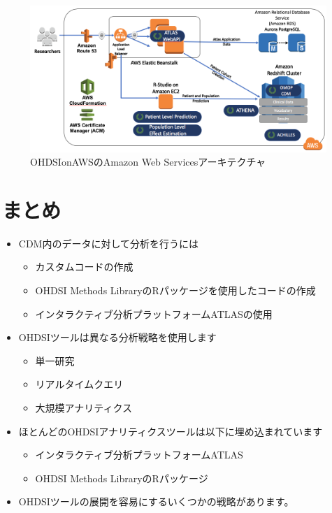 \documentclass[
  11pt]{book}
\makeatletter
\providecommand{\tightlist}{%
  \setlength{\itemsep}{0pt}\setlength{\parskip}{0pt}}
\newenvironment{kframe}{%
\medskip{}
\setlength{\fboxsep}{.8em}
 \def\at@end@of@kframe{}%
 \ifinner\ifhmode%
  \def\at@end@of@kframe{\end{minipage}}%
  \begin{minipage}{\columnwidth}%
 \fi\fi%
 \def\FrameCommand##1{\hskip\@totalleftmargin \hskip-\fboxsep
 \colorbox{myShadeColor}{##1}\hskip-\fboxsep
     \hskip-\linewidth \hskip-\@totalleftmargin \hskip\columnwidth}%
 \MakeFramed {\advance\hsize-\width
   \@totalleftmargin\z@ \linewidth\hsize
   \@setminipage}}%
 {\par\unskip\endMakeFramed%
 \at@end@of@kframe}
\newenvironment{rmdblock}[1]
  {
  \begin{itemize}
  \renewcommand{\labelitemi}{
    \raisebox{-.7\height}[0pt][0pt]{
      {\setkeys{Gin}{width=3em,keepaspectratio}\texttt{[image: images/\#1]}}
    }
  }
  \setlength{\fboxsep}{1em}
  \begin{kframe}
  \item
  }
  {
  \end{kframe}
  \end{itemize}
  }
\newenvironment{rmdsummary}
  {\begin{rmdblock}{summary}}
  {\end{rmdblock}}
\theoremstyle{definition}
\theoremstyle{definition}
\theoremstyle{definition}
\theoremstyle{definition}
\theoremstyle{remark}
\makeatother
\begin{document}
\begin{figure}

{\centering \includegraphics[width=1\linewidth]{images/OhdsiAnalyticsTools/OHDSIonAWSDiagram} 

}

\caption{OHDSIonAWSのAmazon Web Servicesアーキテクチャ}\label{fig:ohdsionawsDiagram}
\end{figure}

\section{まとめ}\label{ux307eux3068ux3081-6}

\begin{rmdsummary}
\begin{itemize}
\tightlist
\item
  CDM内のデータに対して分析を行うには

  \begin{itemize}
  \tightlist
  \item
    カスタムコードの作成
  \item
    OHDSI Methods LibraryのRパッケージを使用したコードの作成
  \item
    インタラクティブ分析プラットフォームATLASの使用
  \end{itemize}
\item
  OHDSIツールは異なる分析戦略を使用します

  \begin{itemize}
  \tightlist
  \item
    単一研究
  \item
    リアルタイムクエリ
  \item
    大規模アナリティクス
  \end{itemize}
\item
  ほとんどのOHDSIアナリティクスツールは以下に埋め込まれています

  \begin{itemize}
  \tightlist
  \item
    インタラクティブ分析プラットフォームATLAS
  \item
    OHDSI Methods LibraryのRパッケージ
  \end{itemize}
\item
  OHDSIツールの展開を容易にするいくつかの戦略があります。
\end{itemize}
\end{rmdsummary}
\end{document}
